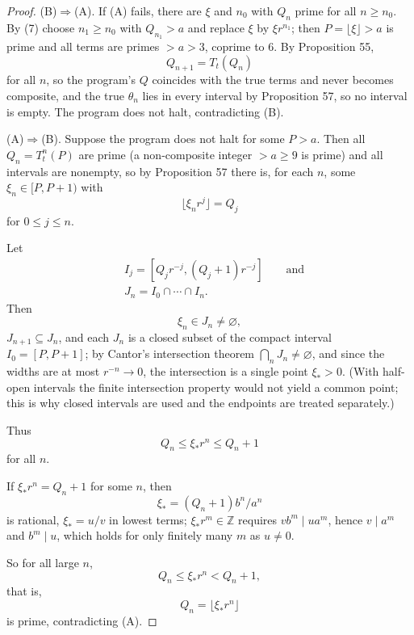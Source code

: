 \documentclass[11pt,reqno]{amsart}
\theoremstyle{definition}
\theoremstyle{remark}
\begin{document}
\begin{proof}\leavevmode\label{proof:58}
(B)\(\Rightarrow\)(A). If (A) fails, there are \(\xi\) and \(n_0\) with
\(Q_n\) prime for all \(n\ge n_0\). By (7) choose \(n_1\ge n_0\) with
\(Q_{n_1}>a\) and replace \(\xi\) by \(\xi r^{n_1}\); then
\(P=\lfloor\xi\rfloor>a\) is prime and all terms are primes \(>a>3\),
coprime to \(6\). By Proposition 55,
\[
Q_{n+1}=T_t(Q_n)
\]
for all
\(n\), so the program's \(Q\) coincides with the true terms and never
becomes composite, and the true \(\theta_n\) lies in every interval by
Proposition 57, so no interval is empty. The program does not halt,
contradicting (B).

(A)\(\Rightarrow\)(B). Suppose the program does not halt for some \(P>a\). Then all
\(Q_n=T_t^n(P)\) are prime (a non-composite integer \(>a\ge9\) is
prime) and all intervals are nonempty, so by Proposition 57 there is,
for each \(n\), some \(\xi_n\in[P,P+1)\) with
\[
\lfloor\xi_nr^j\rfloor=Q_j
\]
for \(0\le j\le n\).

Let
\[
\begin{aligned}
&I_j=[Q_jr^{-j},(Q_j+1)r^{-j}]\qquad \text{and}\\
&J_n=I_0\cap\cdots\cap I_n.
\end{aligned}
\]
Then
\[
\xi_n\in J_n\ne\varnothing,
\]
\(J_{n+1}\subseteq J_n\), and each
\(J_n\) is a closed subset of the compact interval \(I_0=[P,P+1]\); by
Cantor's intersection theorem \(\bigcap_nJ_n\ne\varnothing\), and since
the widths are at most \(r^{-n}\to0\), the intersection is a single
point \(\xi_*>0\). (With half-open intervals the finite intersection
property would not yield a common point; this is why closed intervals
are used and the endpoints are treated separately.)

Thus
\[
Q_n\le\xi_*r^n\le Q_n+1
\]
for all \(n\).

If \(\xi_*r^n=Q_n+1\) for
some \(n\), then
\[
\xi_*=(Q_n+1)b^n/a^n
\]
is rational, \(\xi_*=u/v\) in
lowest terms; \(\xi_*r^m\in\mathbb Z\) requires \(vb^m\mid ua^m\), hence
\(v\mid a^m\) and \(b^m\mid u\), which holds for only finitely many
\(m\) as \(u\ne0\).

So for all large \(n\),
\[
Q_n\le\xi_*r^n<Q_n+1,
\]
that is,
\[
Q_n=\lfloor\xi_*r^n\rfloor
\]
is
prime, contradicting (A). \qedhere
\end{proof}
\end{document}
